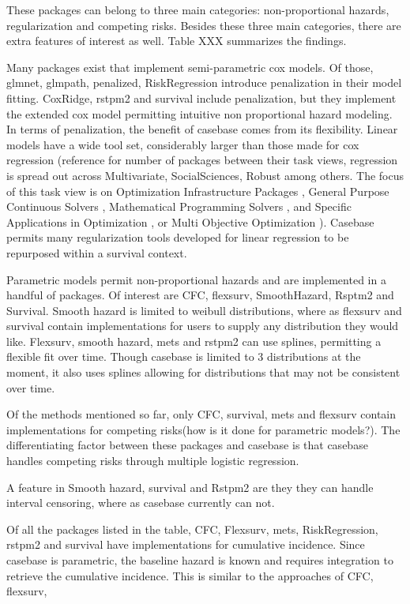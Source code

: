 \documentclass[
]{jss}
\begin{document}
These packages can belong to three main categories: non-proportional
hazards, regularization and competing risks. Besides these three main
categories, there are extra features of interest as well. Table XXX
summarizes the findings.

Many packages exist that implement semi-parametric cox models. Of those,
glmnet, glmpath, penalized, RiskRegression introduce penalization in
their model fitting. CoxRidge, rstpm2 and survival include penalization,
but they implement the extended cox model permitting intuitive non
proportional hazard modeling. In terms of penalization, the benefit of
casebase comes from its flexibility. Linear models have a wide tool set,
considerably larger than those made for cox regression (reference for
number of packages between their task views, regression is spread out
across Multivariate, SocialSciences, Robust among others. The focus of
this task view is on Optimization Infrastructure Packages , General
Purpose Continuous Solvers , Mathematical Programming Solvers , and
Specific Applications in Optimization , or Multi Objective Optimization
). Casebase permits many regularization tools developed for linear
regression to be repurposed within a survival context.

Parametric models permit non-proportional hazards and are implemented in
a handful of packages. Of interest are CFC, flexsurv, SmoothHazard,
Rsptm2 and Survival. Smooth hazard is limited to weibull distributions,
where as flexsurv and survival contain implementations for users to
supply any distribution they would like. Flexsurv, smooth hazard, mets
and rstpm2 can use splines, permitting a flexible fit over time. Though
casebase is limited to 3 distributions at the moment, it also uses
splines allowing for distributions that may not be consistent over time.

Of the methods mentioned so far, only CFC, survival, mets and flexsurv
contain implementations for competing risks(how is it done for
parametric models?). The differentiating factor between these packages
and casebase is that casebase handles competing risks through multiple
logistic regression.

A feature in Smooth hazard, survival and Rstpm2 are they they can handle
interval censoring, where as casebase currently can not.

Of all the packages listed in the table, CFC, Flexsurv, mets,
RiskRegression, rstpm2 and survival have implementations for cumulative
incidence. Since casebase is parametric, the baseline hazard is known
and requires integration to retrieve the cumulative incidence. This is
similar to the approaches of CFC, flexsurv,\\
\end{document}
